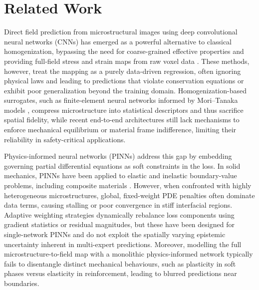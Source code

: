 \documentclass{article}
\begin{document}
\section{Related Work}

Direct field prediction from microstructural images using deep convolutional neural networks (CNNs) has emerged as a powerful alternative to classical homogenization, bypassing the need for coarse-grained effective properties and providing full-field stress and strain maps from raw voxel data \cite{kalidindi2011materials,bessa2017framework,liu2019deep}. These methods, however, treat the mapping as a purely data-driven regression, often ignoring physical laws and leading to predictions that violate conservation equations or exhibit poor generalization beyond the training domain. Homogenization-based surrogates, such as finite-element neural networks informed by Mori–Tanaka models \cite{cecen2016structure}, compress microstructure into statistical descriptors and thus sacrifice spatial fidelity, while recent end-to-end architectures \cite{rao2020predicting} still lack mechanisms to enforce mechanical equilibrium or material frame indifference, limiting their reliability in safety-critical applications.

Physics-informed neural networks (PINNs) \cite{raissi2019physics} address this gap by embedding governing partial differential equations as soft constraints in the loss. In solid mechanics, PINNs have been applied to elastic and inelastic boundary-value problems, including composite materials \cite{haghighat2021physics,duan2023physics}. However, when confronted with highly heterogeneous microstructures, global, fixed-weight PDE penalties often dominate data terms, causing stalling or poor convergence in stiff interfacial regions. Adaptive weighting strategies \cite{gao2022adaptive,wang2021understanding} dynamically rebalance loss components using gradient statistics or residual magnitudes, but these have been designed for single-network PINNs and do not exploit the spatially varying epistemic uncertainty inherent in multi-expert predictions. Moreover, modelling the full microstructure-to-field map with a monolithic physics-informed network typically fails to disentangle distinct mechanical behaviours, such as plasticity in soft phases versus elasticity in reinforcement, leading to blurred predictions near boundaries.
\end{document}
